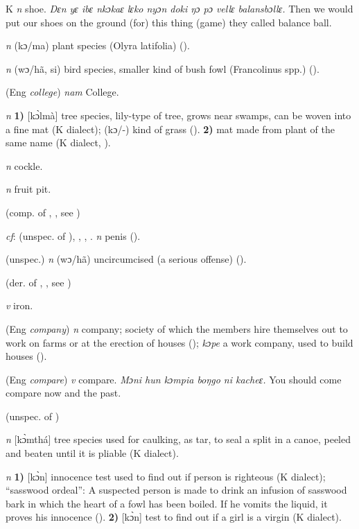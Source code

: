 \begin{letter}{K}
 \textit{n} shoe. \textit{Dɛn yɛ ibɛ nkɔkaɛ lɛko nyɔn doki ŋɔ pɔ vellɛ balansbɔllɛ.} Then we would put our shoes on the ground (for) this thing (game) they called balance ball.

 \textit{n} (kɔ/ma) plant species (Olyra latifolia) (\citealt{Pichl1967}).

 \textit{n} (wɔ/hã, si) bird species, smaller kind of bush fowl (Francolinus spp.) (\citealt{Pichl1967}). 

 (Eng \textit{college}) \textit{nam} College.

 \textit{n} \textbf{1)} [kɔ̀lmà] tree species, lily-type of tree, grows near swamps, can be woven into a fine mat (K dialect); (kɔ/-) kind of grass (\citealt{Pichl1967}). \textbf{2)} mat made from plant of the same name (K dialect, \citealt{Pichl1967}).

 \textit{n} cockle.

 \textit{n} fruit pit.

 (comp. of , , see ) 

 \textit{cf}:  (unspec. of ), , , . \textit{n} penis (\citealt{Pichl1967}).

 (unspec.) \textit{n} (wɔ/hã) uncircumcised (a serious offense) (\citealt{Pichl1967}).

 (der. of , , see ) 

 \textit{v} iron.

 (Eng \textit{company}) \textit{n} company; society of which the members hire themselves out to work on farms or at the erection of houses (\citealt{Pichl1967}); \textit{kɔpe} a work company, used to build houses (\citealt{Hall1938}).

 (Eng \textit{compare}) \textit{v} compare. \textit{Mɔni hun kɔmpia boŋgo ni kacheɛ.} You should come compare now and the past.

 (unspec. of ) 

 \textit{n} [kɔ̀mthá] tree species used for caulking, as tar, to seal a split in a canoe, peeled and beaten until it is pliable (K dialect). 

 \textit{n} \textbf{1)} [kɔ̀n] innocence test used to find out if person is righteous (K dialect); “sasswood ordeal”: A suspected person is made to drink an infusion of sasswood bark in which the heart of a fowl has been boiled. If he vomits the liquid, it proves his innocence (\citealt{Pichl1967}). \textbf{2)} [kɔ̀n] test to find out if a girl is a virgin (K dialect). 


\end{letter}
